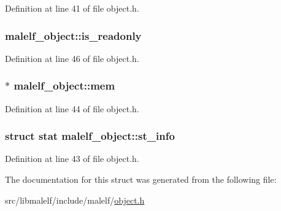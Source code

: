 Definition at line 41 of file object.h.

\hypertarget{structmalelf__object_a3032145296090f7b882d44756596a18c}{
\subsubsection[{is\_\-readonly}]{ {\bf malelf\_\-object::is\_\-readonly}}}
\label{structmalelf__object_a3032145296090f7b882d44756596a18c}


Definition at line 46 of file object.h.

\hypertarget{structmalelf__object_a8a910606f6b5bf327ba116b89b017887}{
\subsubsection[{mem}]{$\ast$ {\bf malelf\_\-object::mem}}}
\label{structmalelf__object_a8a910606f6b5bf327ba116b89b017887}


Definition at line 44 of file object.h.

\hypertarget{structmalelf__object_a33c04ec75fc3c04fb71c4df805338a40}{
\subsubsection[{st\_\-info}]{\setlength{\rightskip}{0pt plus 5cm}struct stat {\bf malelf\_\-object::st\_\-info}}}
\label{structmalelf__object_a33c04ec75fc3c04fb71c4df805338a40}


Definition at line 43 of file object.h.



The documentation for this struct was generated from the following file:\begin{DoxyCompactItemize}
\item 
src/libmalelf/include/malelf/\hyperlink{object_8h}{object.h}\end{DoxyCompactItemize}

